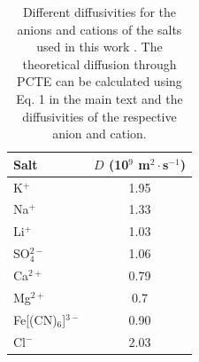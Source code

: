 \documentclass[manuscript=suppinfo,email=true, hyperref=true, keywords=false]{achemso}
\begin{document}
\begin{table}[htbp]
  \centering
  \begin{tabular}{lc}
    \hline
    Salt & $D$ (10$^{9}$ m$^{2}\cdot$s$^{-1}$) \\
    \hline
    K$^{+}$     & 1.95 \\
    Na$^{+}$    & 1.33 \\
    Li$^{+}$    & 1.03 \\
    SO$_{4}^{2-}$       & 1.06 \\
    Ca$^{2+}$   & 0.79\\
    Mg$^{2+}$ & 0.7\\
    Fe{[(CN)$_{6}$]}$^{3-}$   & 0.90\\
    Cl$^{-}$ &  2.03 \\
               \hline
  \end{tabular}
  \caption{Different diffusivities for the anions and cations of the
    salts used in this work \cite{vanysek_2000}. The theoretical
    diffusion through PCTE can be calculated using Eq. 1 in the main
    text and the diffusivities of the respective anion and cation.}
  \label{tab:diff}
\end{table}
\end{document}
